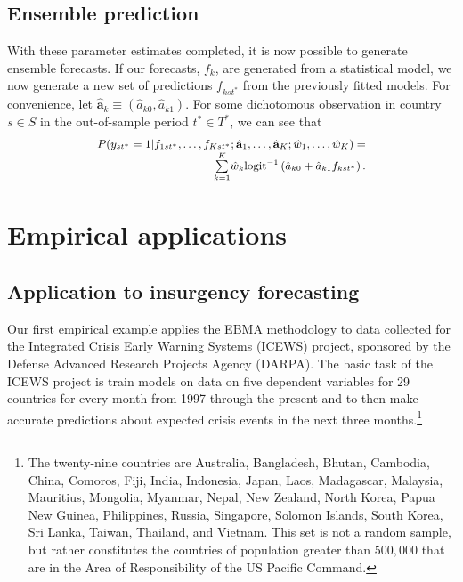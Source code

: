 \documentclass[pdftex,12pt,fullpage,oneside]{amsart}
\begin{document}
\subsection{Ensemble prediction}

With these parameter estimates completed, it is now possible to
generate ensemble forecasts. If our forecasts, $f_k$, are generated
from a statistical model, we now generate a new set of predictions
$f_{kst^*}$ from the previously fitted models. For convenience, let
$\hat{\mathbf{a}}_k \equiv (\hat{a}_{k0}, \hat{a}_{k1})$. For some
dichotomous observation in country $s\in S$ in the out-of-sample period $t^*\in
T^*$, we can see that
\begin{equation}
\small
\begin{array}{r}
P(y_{st^*} = 1 | f_{1st^*}, \ldots, f_{Kst^*} ;
\hat{\mathbf{a}}_1,
\ldots, \hat{\mathbf{a}}_K ; \hat{w}_1, \ldots, \hat{w}_K) = \\
\overset{K}{\underset{k=1}{\sum}} \hat{w}_k
\mbox{logit}^{-1}\left(\hat{a}_{k0} +
\hat{a}_{k1}f_{kst^*}\right).
\end{array}
\end{equation}




\section{Empirical applications}

\subsection{Application to insurgency forecasting}

Our first empirical example applies the EBMA methodology to data
collected for the Integrated Crisis Early Warning Systems (ICEWS)
project, sponsored by the Defense Advanced Research Projects Agency (DARPA).  The basic task of the ICEWS project is train models on data
on five dependent variables for 29 countries for every month from 1997
through the present and to then make accurate predictions about
expected crisis events in the next three months.\footnote{The
  twenty-nine countries are Australia, Bangladesh, Bhutan, Cambodia,
  China, Comoros, Fiji, India, Indonesia, Japan, Laos, Madagascar,
  Malaysia, Mauritius, Mongolia, Myanmar, Nepal, New Zealand, North
  Korea, Papua New Guinea, Philippines, Russia, Singapore, Solomon
  Islands, South Korea, Sri Lanka, Taiwan, Thailand, and Vietnam. This
  set is not a random sample, but rather constitutes the countries of
  population greater than $500,000$ that are in the Area of
  Responsibility of the US Pacific Command.} %
 
\end{document}
